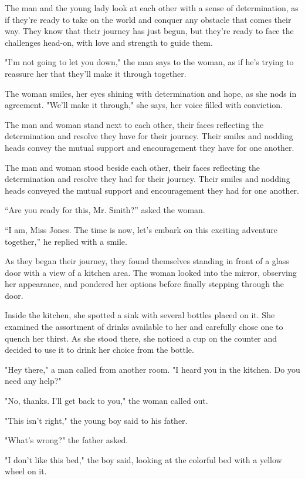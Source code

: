 \documentclass[smalldemyvopaper,11pt,twoside,onecolumn,openright,extrafontsizes]{memoir}
\begin{document}
The man and the young lady look at each other with a sense of determination, as if they're ready to take on the world and conquer any obstacle that comes their way. They know that their journey has just begun, but they're ready to face the challenges head-on, with love and strength to guide them.\par
"I'm not going to let you down," the man says to the woman, as if he's trying to reassure her that they'll make it through together.\par
The woman smiles, her eyes shining with determination and hope, as she nods in agreement. "We'll make it through," she says, her voice filled with conviction.\par
The man and woman stand next to each other, their faces reflecting the determination and resolve they have for their journey. Their smiles and nodding heads convey the mutual support and encouragement they have for one another.\par
The man and woman stood beside each other, their faces reflecting the determination and resolve they had for their journey. Their smiles and nodding heads conveyed the mutual support and encouragement they had for one another.\par
“Are you ready for this, Mr. Smith?” asked the woman.\par
“I am, Miss Jones. The time is now, let’s embark on this exciting adventure together,” he replied with a smile.\par
As they began their journey, they found themselves standing in front of a glass door with a view of a kitchen area. The woman looked into the mirror, observing her appearance, and pondered her options before finally stepping through the door.\par
Inside the kitchen, she spotted a sink with several bottles placed on it. She examined the assortment of drinks available to her and carefully chose one to quench her thirst. As she stood there, she noticed a cup on the counter and decided to use it to drink her choice from the bottle.\par
"Hey there," a man called from another room. "I heard you in the kitchen. Do you need any help?"\par
"No, thanks. I'll get back to you," the woman called out.\par
"This isn't right," the young boy said to his father.\par
"What's wrong?" the father asked.\par
"I don't like this bed," the boy said, looking at the colorful bed with a yellow wheel on it.\par
\end{document}
